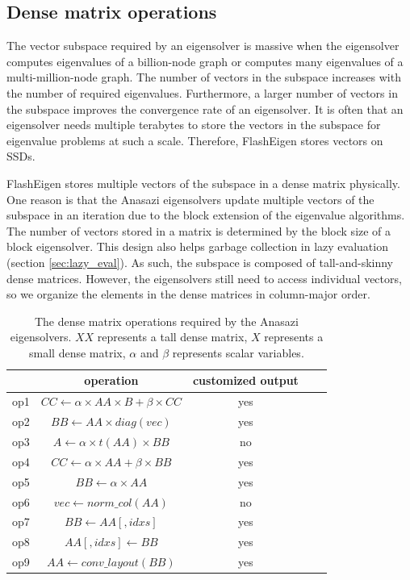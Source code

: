 \subsection{Dense matrix operations}
The vector subspace required by an eigensolver is massive when the eigensolver
computes eigenvalues of a billion-node graph or computes many eigenvalues
of a multi-million-node graph. The number of vectors in the subspace
increases with the number of required eigenvalues. Furthermore, a larger
number of vectors in the subspace improves the convergence rate of an eigensolver. 
It is often that an eigensolver needs multiple terabytes to store the vectors
in the subspace for eigenvalue problems at such a scale. Therefore, FlashEigen
stores vectors on SSDs.

FlashEigen stores multiple vectors of the subspace in a dense matrix physically.
One reason is that the Anasazi eigensolvers update multiple vectors of the subspace
in an iteration due to the block extension of the eigenvalue algorithms.
The number of vectors stored in a matrix is determined by the block size of
a block eigensolver.
This design also helps garbage collection in lazy evaluation (section \ref{sec:lazy_eval}).
As such, the subspace is composed of tall-and-skinny dense matrices.
However, the eigensolvers still need to access individual vectors,
so we organize the elements in the dense matrices in column-major order. 

\begin{table}
	\begin{center}
		\small
		\begin{tabular}{|c|c|c|c|c|}
			\hline
			& operation & customized output \\
			\hline
			op1 & $CC \leftarrow \alpha \times AA \times B + \beta \times CC$ & yes \\
			\hline
			op2 & $BB \leftarrow AA \times diag(vec)$ & yes \\
			\hline
			op3 & $A \leftarrow \alpha \times t(AA) \times BB$ & no \\
			\hline
			op4 & $CC \leftarrow \alpha \times AA + \beta \times BB$ & yes \\
			\hline
			op5 & $BB \leftarrow \alpha \times AA$ & yes \\
			\hline
			op6 & $vec \leftarrow norm\_col(AA)$ & no \\
			\hline
			op7 & $BB \leftarrow AA[,idxs]$ & yes \\
			\hline
			op8 & $AA[,idxs] \leftarrow BB$ & yes \\
			\hline
			op9 & $AA \leftarrow conv\_layout(BB)$ & yes \\
			\hline
		\end{tabular}
		\normalsize
	\end{center}
	\caption{The dense matrix operations required by the Anasazi eigensolvers.
		$XX$ represents a tall dense matrix, $X$ represents a small dense matrix,
	$\alpha$ and $\beta$ represents scalar variables.}
	\label{anasazi_ops}
\end{table}

